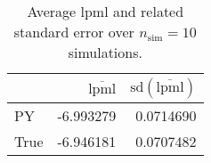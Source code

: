 \begin{table}[H]

\caption{Average lpml and related standard error over $n_{\text{sim}} = 10$ simulations.}
\centering
\begin{tabular}[t]{lrr}
\toprule
  & $\overbar{\text{lpml}}$ & $\text{sd}(\overbar{\text{lpml}})$\\
\midrule
PY & -6.993279 & 0.0714690\\
True & -6.946181 & 0.0707482\\
\bottomrule
\end{tabular}
\end{table}